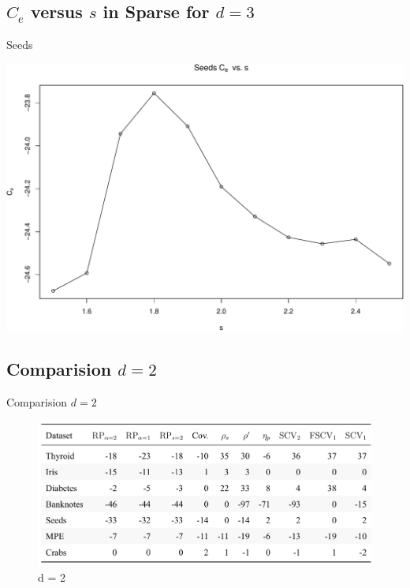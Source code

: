 \documentclass[ignorenonframetext,]{beamer}
\begin{document}
\subsection{\texorpdfstring{\(C_e\) versus \(s\) in Sparse for
\(d = 3\)}{C\_e versus s in Sparse for d = 3}}\label{c_e-versus-s-in-sparse-for-d-3}

\begin{frame}{Seeds}

\begin{center}\includegraphics[width=1\linewidth]{Presentation_files/figure-beamer/unnamed-chunk-29-1} \end{center}

\end{frame}

\subsection{\texorpdfstring{Comparision
\(d = 2\)}{Comparision d = 2}}\label{comparision-d-2}

\begin{frame}{Comparision \(d = 2\)}

\begin{figure}
\centering
\includegraphics{pics/01.png}
\caption{d = 2}
\end{figure}

\end{frame}
\end{document}
